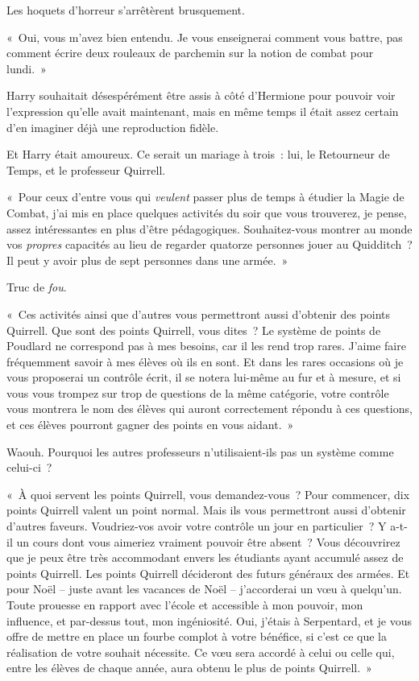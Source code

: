 Les hoquets d'horreur s'arrêtèrent brusquement.

«~Oui, vous m'avez bien entendu. Je vous enseignerai comment vous battre, pas comment écrire deux rouleaux de parchemin sur la notion de combat pour lundi.~»

Harry souhaitait désespérément être assis à côté d'Hermione pour pouvoir voir l'expression qu'elle avait maintenant, mais en même temps il était assez certain d'en imaginer déjà une reproduction fidèle.

Et Harry était amoureux. Ce serait un mariage à trois~: lui, le Retourneur de Temps, et le professeur Quirrell.

«~Pour ceux d'entre vous qui \emph{veulent} passer plus de temps à étudier la Magie de Combat, j'ai mis en place quelques activités du soir que vous trouverez, je pense, assez intéressantes en plus d'être pédagogiques. Souhaitez-vous montrer au monde vos \emph{propres} capacités au lieu de regarder quatorze personnes jouer au Quidditch~? Il peut y avoir plus de sept personnes dans une armée.~»

Truc de \emph{fou}.

«~Ces activités ainsi que d'autres vous permettront aussi d'obtenir des points Quirrell. Que sont des points Quirrell, vous dites~? Le système de points de Poudlard ne correspond pas à mes besoins, car il les rend trop rares. J'aime faire fréquemment savoir à mes élèves où ils en sont. Et dans les rares occasions où je vous proposerai un contrôle écrit, il se notera lui-même au fur et à mesure, et si vous vous trompez sur trop de questions de la même catégorie, votre contrôle vous montrera le nom des élèves qui auront correctement répondu à ces questions, et ces élèves pourront gagner des points en vous aidant.~»

Waouh. Pourquoi les autres professeurs n'utilisaient-ils pas un système comme celui-ci~?

«~À quoi servent les points Quirrell, vous demandez-vous~? Pour commencer, dix points Quirrell valent un point normal. Mais ils vous permettront aussi d'obtenir d'autres faveurs. Voudriez-vos avoir votre contrôle un jour en particulier~? Y a-t-il un cours dont vous aimeriez vraiment pouvoir être absent~? Vous découvrirez que je peux être très accommodant envers les étudiants ayant accumulé assez de points Quirrell. Les points Quirrell décideront des futurs généraux des armées. Et pour Noël -- juste avant les vacances de Noël -- j'accorderai un vœu à quelqu'un. Toute prouesse en rapport avec l'école et accessible à mon pouvoir, mon influence, et par-dessus tout, mon ingéniosité. Oui, j'étais à Serpentard, et je vous offre de mettre en place un fourbe complot à votre bénéfice, si c'est ce que la réalisation de votre souhait nécessite. Ce vœu sera accordé à celui ou celle qui, entre les élèves de chaque année, aura obtenu le plus de points Quirrell.~»

